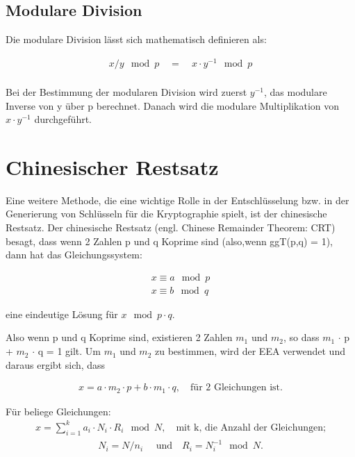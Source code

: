 \subsection{Modulare Division}

Die modulare Division lässt sich mathematisch definieren als:
\begin{ceqn}
\begin{align*}
    x/y \mod p \quad = \quad x \cdot y^{-1} \mod p \\
\end{align*}
\end{ceqn}

Bei der Bestimmung der modularen Division wird zuerst $ y^{-1}$, das modulare Inverse von y über p berechnet. Danach wird die modulare Multiplikation von $ x \cdot y^{-1} $ durchgeführt.  

\section{Chinesischer Restsatz}

Eine weitere Methode, die eine wichtige Rolle in der
Entschlüsselung bzw. in der Generierung von Schlüsseln für die
Kryptographie spielt, ist der chinesische Restsatz.
Der chinesische Restsatz (engl. Chinese Remainder Theorem: CRT) besagt, dass wenn 2 Zahlen p und q Koprime
sind (also,wenn ggT(p,q) = 1), dann hat das Gleichungssystem:

\begin{ceqn}
\begin{align*}
      x \equiv a \mod p \\
      x \equiv b \mod q 
\end{align*}
\end{ceqn}
eine eindeutige Lösung für \(x \mod p \cdot q \). 

Also wenn p und q Koprime sind, existieren 2 Zahlen $ m_1 $ und $ m_2 $, so dass $ m_1 $ $\cdot$ p + $ m_2 $ $\cdot $ q = 1 gilt. Um $ m_1 $ und  $ m_2 $ zu bestimmen, wird der EEA verwendet und daraus ergibt sich, dass

\begin{ceqn}
   \begin{align*}
       x = a \cdot m_2 \cdot p + b \cdot m_1 \cdot q, \quad \text{für 2 Gleichungen ist.}
   \end{align*}
\end{ceqn}
Für beliege Gleichungen:
\begin{align}
     x = \sum_{i=1}^{k} a_i \cdot N_i \cdot R_i \mod N, \quad \text{mit k, die Anzahl der Gleichungen;}
     \label{crt}
\end{align}
\begin{align*}
     N_i = N/n_i \quad \text{ und} \quad R_i = N_i^{-1} \mod N.
\end{align*}


